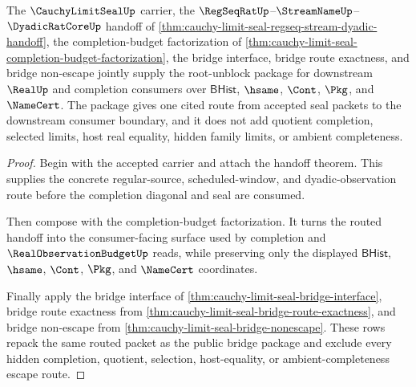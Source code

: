\begin{theorem}
\label{thm:cauchy-limit-seal-root-unblock-package}
The $\CauchyLimitSealUp$ carrier, the $\RegSeqRatUp$--$\StreamNameUp$--$\DyadicRatCoreUp$ handoff of \autoref{thm:cauchy-limit-seal-regseq-stream-dyadic-handoff}, the completion-budget factorization of \autoref{thm:cauchy-limit-seal-completion-budget-factorization}, the bridge interface, bridge route exactness, and bridge non-escape jointly supply the root-unblock package for downstream $\RealUp$ and completion consumers over $\mathsf{BHist}$, $\hsame$, $\Cont$, $\Pkg$, and $\NameCert$. The package gives one cited route from accepted seal packets to the downstream consumer boundary, and it does not add quotient completion, selected limits, host real equality, hidden family limits, or ambient completeness.
\end{theorem}
\begin{proof}
Begin with the accepted carrier and attach the handoff theorem. This supplies the concrete regular-source, scheduled-window, and dyadic-observation route before the completion diagonal and seal are consumed.

Then compose with the completion-budget factorization. It turns the routed handoff into the consumer-facing surface used by completion and $\RealObservationBudgetUp$ reads, while preserving only the displayed $\mathsf{BHist}$, $\hsame$, $\Cont$, $\Pkg$, and $\NameCert$ coordinates.

Finally apply the bridge interface of \autoref{thm:cauchy-limit-seal-bridge-interface}, bridge route exactness from \autoref{thm:cauchy-limit-seal-bridge-route-exactness}, and bridge non-escape from \autoref{thm:cauchy-limit-seal-bridge-nonescape}. These rows repack the same routed packet as the public bridge package and exclude every hidden completion, quotient, selection, host-equality, or ambient-completeness escape route.
\end{proof}

